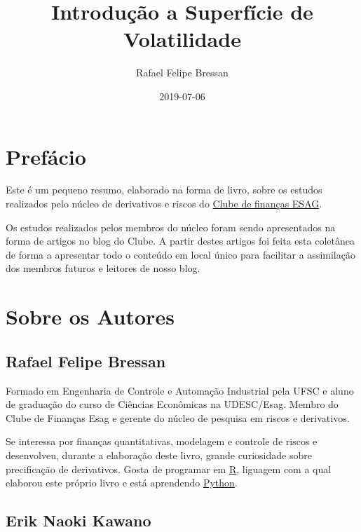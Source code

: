 \documentclass[]{book}
\title{Introdução a Superfície de Volatilidade}
\author{Rafael Felipe Bressan}
\date{2019-07-06}
\theoremstyle{definition}
\theoremstyle{definition}
\theoremstyle{definition}
\theoremstyle{remark}
\begin{document}
\maketitle

{
\setcounter{tocdepth}{1}
\tableofcontents
}
\hypertarget{prefacio}{%
\chapter*{Prefácio}\label{prefacio}}

Este é um pequeno resumo, elaborado na forma de livro, sobre os estudos realizados pelo núcleo de derivativos e riscos do \href{https://clubedefinancas.com.br}{Clube de finanças ESAG}.

Os estudos realizados pelos membros do núcleo foram sendo apresentados na forma de artigos no blog do Clube. A partir destes artigos foi feita esta coletânea de forma a apresentar todo o conteúdo em local único para facilitar a assimilação dos membros futuros e leitores de nosso blog.

\hypertarget{sobre-os-autores}{%
\chapter*{Sobre os Autores}\label{sobre-os-autores}}

\hypertarget{rafael-felipe-bressan}{%
\section*{Rafael Felipe Bressan}\label{rafael-felipe-bressan}}

Formado em Engenharia de Controle e Automação Industrial pela UFSC e aluno de graduação do curso de Ciências Econômicas na UDESC/Esag. Membro do Clube de Finanças Esag e gerente do núcleo de pesquisa em riscos e derivativos.

Se interessa por finanças quantitativas, modelagem e controle de riscos e desenvolveu, durante a elaboração deste livro, grande curiosidade sobre precificação de derivativos. Gosta de programar em \href{https://cran.r-project.org/}{R}, liguagem com a qual elaborou este próprio livro e está aprendendo \href{https://www.python.org/}{Python}.

\hypertarget{erik-naoki-kawano}{%
\section*{Erik Naoki Kawano}\label{erik-naoki-kawano}}
\end{document}
